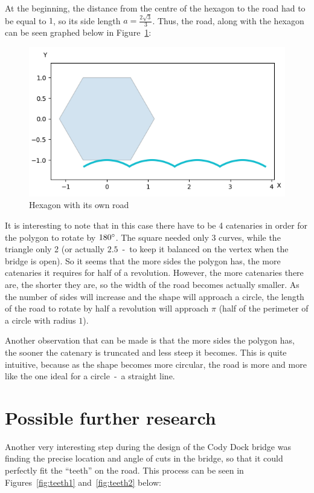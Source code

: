 \documentclass[12pt]{article}
\begin{document}
        At the beginning, the distance from the centre of the hexagon to the road had to be equal to $1$, so its side length $a=\frac{2\sqrt{3}}{3}$. Thus, the road, along with the hexagon can be seen graphed below in Figure~\ref{fig:hexagon}:
        \begin{figure}[H]
            \centering
            \includegraphics[width=0.8\linewidth]{images/hexagon_bridge.png}
            \caption{Hexagon with its own road}\label{fig:hexagon}
        \end{figure}

        It is interesting to note that in this case there have to be 4 catenaries in order for the polygon to rotate by $180\degree$. The square needed only 3 curves, while the triangle only 2 (or actually $2.5$~-~to keep it balanced on the vertex when the bridge is open). So it seems that the more sides the polygon has, the more catenaries it requires for half of a revolution. However, the more catenaries there are, the shorter they are, so the width of the road becomes actually smaller. As the number of sides will increase and the shape will approach a circle, the length of the road to rotate by half a revolution will approach $\pi$ (half of the perimeter of a circle with radius $1$).

        Another observation that can be made is that the more sides the polygon has, the sooner the catenary is truncated and less steep it becomes. This is quite intuitive, because as the shape becomes more circular, the road is more and more like the one ideal for a circle~-~a straight line.

    \section{Possible further research}

        Another very interesting step during the design of the Cody Dock bridge was finding the precise location and angle of cuts in the bridge, so that it could perfectly fit the ``teeth'' on the road. This process can be seen in Figures~\ref{fig:teeth1} and~\ref{fig:teeth2} below:
\end{document}
